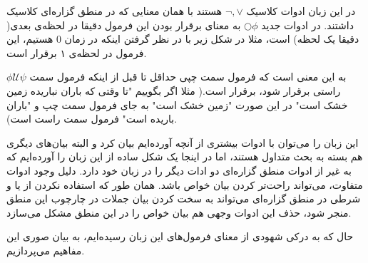 در این زبان ادوات کلاسیک 
$\neg, \lor$
هستند با همان معنایی که در منطق گزاره‌ای کلاسیک داشتند.  
در ادوات جدید 
$\bigcirc \phi$
به معنای برقرار بودن این فرمول دقیقا در لحظه‌ی بعدی( دقیقا یک لحظه) است، مثلا در شکل زیر با در نظر گرفتن اینکه در زمان 0 هستیم، این فرمول در لحظه‌ی ۱ برقرار است.
	\begin{center}
\end{center}
$\phi \mathcal{U}\psi$
به این معنی است که فرمول سمت چپی حداقل تا قبل از اینکه فرمول سمت راستی برقرار شود، برقرار است.( مثلا اگر بگوییم "تا وقتی که باران نباریده زمین خشک است" در این صورت "زمین خشک است" به جای فرمول سمت چپ و "باران باریده است" فرمول سمت راست است).
\begin{center}
\end{center}

این زبان را می‌توان با ادوات بیشتری از آنچه آورده‌ایم بیان کرد و البته بیان‌های دیگری هم بسته به بحث متداول هستند، اما در اینجا یک شکل ساده از این زبان را آورده‌ایم که به غیر از ادوات منطق گزاره‌ای دو ادات دیگر را در زبان خود دارد. دلیل وجود ادوات متفاوت، می‌تواند راحت‌تر کردن بیان خواص باشد. همان طور که استفاده نکردن از یا و شرطی در منطق گزاره‌ای می‌تواند به سخت کردن بیان جملات در چارچوب این منطق منجر شود، حذف این ادوات وجهی هم بیان خواص را در این منطق مشکل می‌سازد. 

حال که به درکی شهودی از معنای فرمول‌های این زبان رسیده‌ایم، به بیان صوری این مفاهیم می‌پردازیم.

